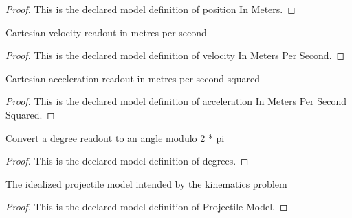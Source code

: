 \begin{proof}
  This is the declared model definition of position In Meters.
\end{proof}
\begin{definition}
  \label{def:physics:phyx-mini-0745:phyxminiproblems-problemphyxmini0745-velocityinmeterspersecond}
  Cartesian velocity readout in metres per second
\end{definition}
\begin{proof}
  This is the declared model definition of velocity In Meters Per Second.
\end{proof}
\begin{definition}
  \label{def:physics:phyx-mini-0745:phyxminiproblems-problemphyxmini0745-accelerationinmeterspersecondsquared}
  Cartesian acceleration readout in metres per second squared
\end{definition}
\begin{proof}
  This is the declared model definition of acceleration In Meters Per Second Squared.
\end{proof}
\begin{definition}[degrees]
  \label{def:physics:phyx-mini-0745:phyxminiproblems-problemphyxmini0745-degrees}
  Convert a degree readout to an angle modulo 2 * pi
\end{definition}
\begin{proof}
  This is the declared model definition of degrees.
\end{proof}
\begin{definition}
  \label{def:physics:phyx-mini-0745:phyxminiproblems-problemphyxmini0745-projectilemodel}
  The idealized projectile model intended by the kinematics problem
\end{definition}
\begin{proof}
  This is the declared model definition of Projectile Model.
\end{proof}
